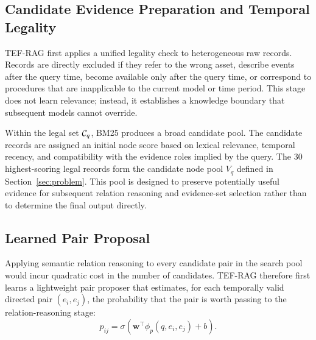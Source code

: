 \subsection{Candidate Evidence Preparation and Temporal Legality}

TEF-RAG first applies a unified legality check to heterogeneous raw records. Records are directly excluded if they refer to the wrong asset, describe events after the query time, become available only after the query time, or correspond to procedures that are inapplicable to the current model or time period. This stage does not learn relevance; instead, it establishes a knowledge boundary that subsequent models cannot override.

Within the legal set $\mathcal{C}_q$, BM25 produces a broad candidate pool. The candidate records are assigned an initial node score based on lexical relevance, temporal recency, and compatibility with the evidence roles implied by the query. The 30 highest-scoring legal records form the candidate node pool $V_q$ defined in Section~\ref{sec:problem}. This pool is designed to preserve potentially useful evidence for subsequent relation reasoning and evidence-set selection rather than to determine the final output directly.
\subsection{Learned Pair Proposal}

Applying semantic relation reasoning to every candidate pair in the search pool would incur quadratic cost in the number of candidates. TEF-RAG therefore first learns a lightweight pair proposer that estimates, for each temporally valid directed pair $(e_i,e_j)$, the probability that the pair is worth passing to the relation-reasoning stage:
\begin{equation}
p_{ij}
=
\sigma\!\left(
\mathbf{w}^{\top}\phi_p(q,e_i,e_j)+b
\right).
\label{eq:pair_proposal}
\end{equation}

